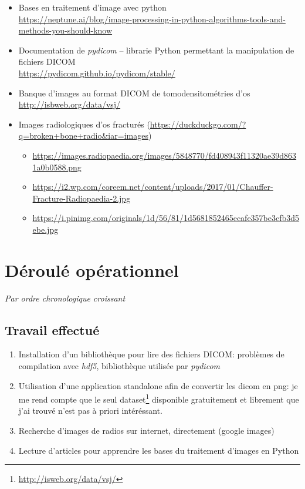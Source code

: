 \documentclass{article}
\begin{document}
\begin{itemize}
	\item Bases en traitement d'image avec python \\ {\small \url{https://neptune.ai/blog/image-processing-in-python-algorithms-tools-and-methods-you-should-know}} \\[0.1pt]
	\item Documentation de \emph{pydicom} -- librarie Python permettant la manipulation de fichiers DICOM \\ \url{https://pydicom.github.io/pydicom/stable/}\\[0.1pt]
	\item Banque d'images au format DICOM de tomodensitométries d'os \\ \url{http://isbweb.org/data/vsj/}\\[0.1pt]
	\item Images radiologiques d'os fracturés {\footnotesize (\url{https://duckduckgo.com/?q=broken+bone+radio&iar=images})}
		\begin{itemize}
			\item \url{https://images.radiopaedia.org/images/5848770/fd408943f11320ae39d8631a0b0588.png}
			\item \url{https://i2.wp.com/coreem.net/content/uploads/2017/01/Chauffer-Fracture-Radiopaedia-2.jpg}
			\item \url{https://i.pinimg.com/originals/1d/56/81/1d5681852465ecafe357be3cfb3d5ebe.jpg}
		\end{itemize} %
\end{itemize}

\section{Déroulé opérationnel}

\emph{Par ordre chronologique croissant} 

\subsection{Travail effectué}


\begin{enumerate}
\item Installation d'un bibliothèque pour lire des fichiers DICOM: problèmes de compilation avec \emph{hdf5}, bibliothèque utilisée par \emph{pydicom} 
\item Utilisation d'une application standalone afin de convertir les dicom en png: je me rend compte que le seul dataset\footnote{\url{http://isweb.org/data/vsj/}} disponible gratuitement et librement que j'ai trouvé
  n'est pas à priori intéréssant.
\item Recherche d'images de radios sur internet, directement (google images)
\item Lecture d'articles pour apprendre les bases du traitement d'images en Python
\end{enumerate}
\end{document}
